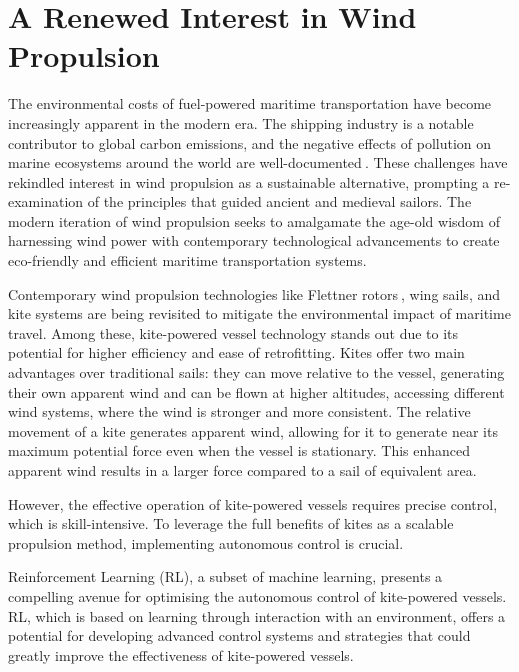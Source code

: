 \section{A Renewed Interest in Wind Propulsion}
The environmental costs of fuel-powered maritime transportation have become increasingly apparent in the modern era. The shipping industry is a notable contributor to global carbon emissions, and the negative effects of pollution on marine ecosystems around the world are well-documented$~$\cite{corbett2007mortality}. These challenges have rekindled interest in wind propulsion as a sustainable alternative, prompting a re-examination of the principles that guided ancient and medieval sailors. The modern iteration of wind propulsion seeks to amalgamate the age-old wisdom of harnessing wind power with contemporary technological advancements to create eco-friendly and efficient maritime transportation systems.

Contemporary wind propulsion technologies like Flettner rotors$~$\cite{vahs2019retrofitting}, wing sails, and kite systems are being revisited to mitigate the environmental impact of maritime travel. Among these, kite-powered vessel technology stands out due to its potential for higher efficiency and ease of retrofitting. Kites offer two main advantages over traditional sails: they can move relative to the vessel, generating their own apparent wind and can be flown at higher altitudes, accessing different wind systems, where the wind is stronger and more consistent. The relative movement of a kite generates apparent wind, allowing for it to generate near its maximum potential force even when the vessel is stationary. This enhanced apparent wind results in a larger force compared to a sail of equivalent area.

However, the effective operation of kite-powered vessels requires precise control, which is skill-intensive. To leverage the full benefits of kites as a scalable propulsion method, implementing autonomous control is crucial. 

Reinforcement Learning (RL), a subset of machine learning, presents a compelling avenue for optimising the autonomous control of kite-powered vessels. RL, which is based on learning through interaction with an environment, offers a potential for developing advanced control systems and strategies that could greatly improve the effectiveness of kite-powered vessels. 




